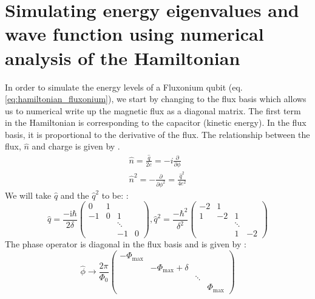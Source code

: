 	\section{Simulating energy eigenvalues and wave function using numerical analysis of the Hamiltonian}
    In order to simulate the energy levels of a Fluxonium qubit (eq. \ref{eq:hamiltonian_fluxonium}), we start by changing to the flux basis which allows us to numerical write up the magnetic flux as a diagonal matrix. The first term in the Hamiltonian is corresponding to the capacitor (kinetic energy). In the flux basis, it is proportional to the derivative of the flux. The relationship between the flux, $\hat{n}$ and charge is given by \cite{Aumann2022}. 
        \begin{equation}
            \begin{aligned}
                 \hat{n} =  \frac{\hat{q}}{2e} = -i \frac{\partial}{\partial \phi} \\
                \hat{n}^{2} = -\frac{\partial}{\partial \phi^{2}}  = \frac{\hat{q}^{2}}{4e^2}
            \end{aligned}
        \end{equation}
        We will take $\hat{q}$ and the $\hat{q}^2$ to be: \cite{Aumann2022}: 
        \begin{equation}
            \hat{q} =\frac{-\mathrm{i} \hbar}{2 \delta}\left(\begin{array}{cccc}
            0 & 1 & & \\
            -1 & 0 & 1 & \\
            & & \ddots & \\
            & & -1 & 0
            \end{array}\right) 
            ,
            \hat{q}^2 = \frac{-\hbar^2}{\delta^2}\left(\begin{array}{cccc}
            -2 & 1 & & \\
            1 & -2 & 1 & \\
            & & \ddots & \\
            & & 1 & -2
            \end{array}\right)
        \end{equation}
    The phase operator is diagonal in the flux basis and is given by \cite{Aumann2022}:
    \begin{equation}
        \hat{\phi} \rightarrow \frac{2\pi}{\Phi_0} \left(\begin{array}{cccc}
        -\Phi_{\max } & & & \\
        & -\Phi_{\max }+\delta & & \\
        & & \ddots & \\
        & & & \Phi_{\max }
        \end{array}\right)
    \end{equation}
